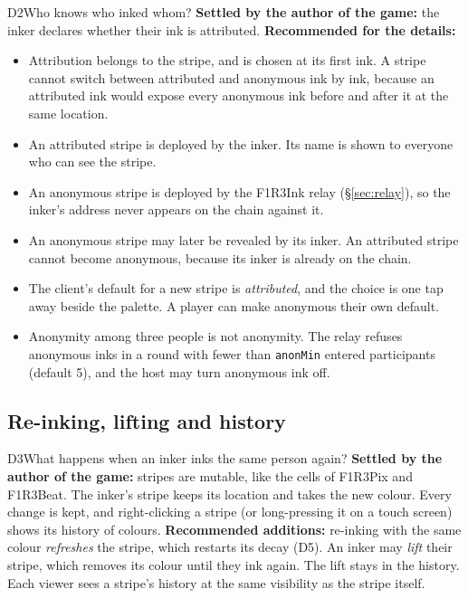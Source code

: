 \documentclass[11pt,a4paper]{article}
\newcommand{\code}[1]{\texttt{#1}}
\begin{document}
\begin{decision}{D2}{Who knows who inked whom?}
\textbf{Settled by the author of the game:} the inker declares whether their ink is attributed.
\textbf{Recommended for the details:}
\begin{itemize}[leftmargin=1.2em,itemsep=1pt]
\item Attribution belongs to the stripe, and is chosen at its first ink. A stripe cannot switch
  between attributed and anonymous ink by ink, because an attributed ink would expose every
  anonymous ink before and after it at the same location.
\item An attributed stripe is deployed by the inker. Its name is shown to everyone who can see
  the stripe.
\item An anonymous stripe is deployed by the F1R3Ink relay (\S\ref{sec:relay}), so the inker's
  address never appears on the chain against it.
\item An anonymous stripe may later be revealed by its inker. An attributed stripe cannot become
  anonymous, because its inker is already on the chain.
\item The client's default for a new stripe is \emph{attributed}, and the choice is one tap
  away beside the palette. A player can make anonymous their own default.
\item Anonymity among three people is not anonymity. The relay refuses anonymous inks in a round
  with fewer than \code{anonMin} entered participants (default 5), and the host may turn
  anonymous ink off.
\end{itemize}
\end{decision}

\subsection{Re-inking, lifting and history}

\begin{decision}{D3}{What happens when an inker inks the same person again?}
\textbf{Settled by the author of the game:} stripes are mutable, like the cells of F1R3Pix and
F1R3Beat. The inker's stripe keeps its location and takes the new colour. Every change is kept,
and right-clicking a stripe (or long-pressing it on a touch screen) shows its history of colours.
\textbf{Recommended additions:} re-inking with the same colour \emph{refreshes} the stripe, which
restarts its decay (D5). An inker may \emph{lift} their stripe, which removes its colour until
they ink again. The lift stays in the history. Each viewer sees a stripe's history at the same
visibility as the stripe itself.
\end{decision}
\end{document}
